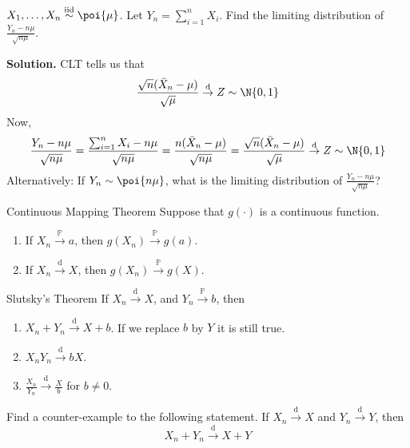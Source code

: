 \begin{Example}{}{}
    $ X_1,\ldots,X_n\stackrel{\text{iid}}{\sim}\poi{\mu} $.
    Let $ Y_n=\sum_{i=1}^{n} X_i $. Find the limiting
    distribution of $ \displaystyle \frac{Y_n-n\mu}{\sqrt{n\mu}} $.

    \textbf{Solution.} CLT tells us that
    \[ \frac{\sqrt{n}(\bar{X}_n-\mu)}{\sqrt{\mu}}\stackrel{\text{d}}{\to}Z\sim \N{0,1} \]
    Now,
    \[ \frac{Y_n-n\mu}{\sqrt{n\mu}}=
        \frac{\sum_{i=1}^{n} X_i-n\mu}{\sqrt{n\mu}}=
        \frac{n(\bar{X}_n-\mu)}{\sqrt{n\mu}}=
        \frac{\sqrt{n}(\bar{X}_n-\mu)}{\sqrt{\mu}}\stackrel{\text{d}}{\to}Z\sim \N{0,1}  \]
    Alternatively: If $ Y_n \sim \poi{n\mu} $, what is the limiting
    distribution of  $ \displaystyle \frac{Y_n-n\mu}{\sqrt{n\mu}} $?
\end{Example}
\begin{Theorem}{Continuous Mapping Theorem}{}
    Suppose that $ g(\cdot) $ is a continuous function.
    \begin{enumerate}[label=(\arabic*)]
        \item If $ X_n\stackrel{\mathbb{P}}{\to}a $, then
              $ g(X_n)\stackrel{\mathbb{P}}{\to}g(a) $.
        \item If $ X_n\stackrel{\text{d}}{\to}X $,
              then $ g(X_n)\stackrel{\mathbb{P}}{\to}g(X) $.
    \end{enumerate}
\end{Theorem}
\begin{Theorem}{Slutsky's Theorem}{}
    If $ X_n\stackrel{\text{d}}{\to} X $, and
    $ Y_n\stackrel{\mathbb{P}}{\to}b $, then
    \begin{enumerate}[label=(\alph*)]
        \item $ X_n+Y_n\stackrel{\text{d}}{\to}X+b $.
              If we replace $ b $ by $ Y $ it is still true.
        \item $ X_n Y_n\stackrel{\text{d}}{\to}bX $.
        \item $ \displaystyle \frac{X_n}{Y_n}\stackrel{\text{d}}{\to}
                  \frac{X}{b} $ for $ b\neq 0 $.
    \end{enumerate}
\end{Theorem}
\begin{Exercise}{}{}
    Find a counter-example to the following statement.
    If $ X_n\stackrel{\text{d}}{\to}X $ and $ Y_n\stackrel{\text{d}}{\to}Y $,
    then
    \[ X_n+Y_n\stackrel{\text{d}}{\to}X+Y \]
\end{Exercise}
